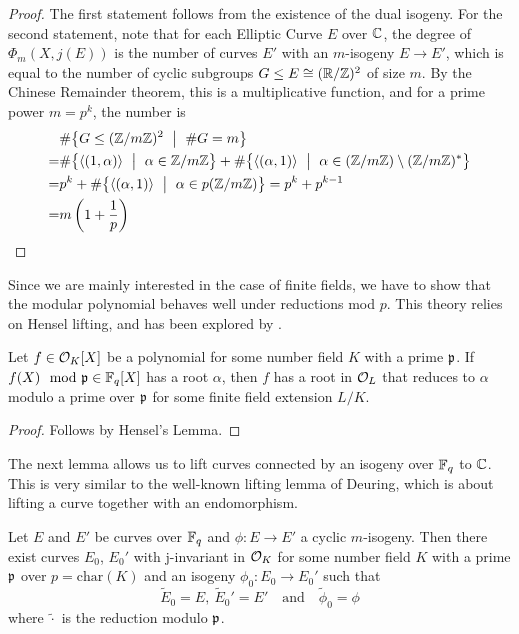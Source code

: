 \begin{proof}
    The first statement follows from the existence of the dual isogeny.
    For the second statement, note that for each Elliptic Curve $E$ over $\mathbb{C}$, the degree of $\Phi_m(X, j(E))$ is the number of curves $E'$ with an $m$-isogeny $E \to E'$, which is equal to the number of cyclic subgroups $G \leq E \cong (\mathbb{R}/\mathbb{Z})^2$ of size $m$.
    By the Chinese Remainder theorem, this is a multiplicative function, and for a prime power $m = p^k$, the number is
    \begin{align*}
       &\#\bigl\{ G \leq (\Z/m\Z)^2 \ \bigm| \ \#G = m \bigr\} \\
       =& \#\bigl\{ \langle (1, \alpha) \rangle \ \bigm| \ \alpha \in \Z/m\Z \bigr\} + \#\bigl\{ \langle (\alpha, 1) \rangle \ \bigm| \ \alpha \in (\Z/m\Z) \setminus (\Z/m\Z)^* \bigr\} \\
       =& p^k + \#\bigl\{ \langle (\alpha, 1) \rangle \ \bigm| \ \alpha \in p(\Z/m\Z) \bigr\} = p^k + p^{k - 1} \\
       =& m \left( 1 + \frac 1 p \right) \qedhere
    \end{align*}
\end{proof}
Since we are mainly interested in the case of finite fields, we have to show that the modular polynomial behaves well under reductions mod $p$.
This theory relies on Hensel lifting, and has been explored by \cite{deuring_endomorphism_rings}.
\begin{lemma}
    \label{prop:modified_hensel_lifting}
    Let $f \in \mathcal{O}_K[X]$ be a polynomial for some number field $K$ with a prime $\mathfrak{p}$.
    If $f(X) \mod {\mathfrak{p}} \in \mathbb{F}_q[X]$ has a root $\alpha$, then $f$ has a root in $\mathcal{O}_L$ that reduces to $\alpha$ modulo a prime over $\mathfrak{p}$ for some finite field extension $L/K$.
\end{lemma}
\begin{proof}
    Follows by Hensel's Lemma.
\end{proof}
The next lemma allows us to lift curves connected by an isogeny over $\mathbb{F}_q$ to $\mathbb{C}$.
This is very similar to the well-known lifting lemma of Deuring, which is about lifting a curve together with an endomorphism.
\begin{lemma}
    Let $E$ and $E'$ be curves over $\mathbb{F}_q$ and $\phi: E \to E'$ a cyclic $m$-isogeny.
    Then there exist curves $E_0$, $E_0'$ with j-invariant in $\mathcal{O}_K$ for some number field $K$ with a prime $\mathfrak{p}$ over $p = \mathrm{char}(K)$ and an isogeny $\phi_0: E_0 \to E_0'$ such that
    \begin{equation*}
        \tilde{E}_0 = E, \ \tilde{E}_0' = E' \quad \text{and} \quad \tilde{\phi}_0 = \phi
    \end{equation*}
    where $\tilde{\cdot}$ is the reduction modulo $\mathfrak{p}$.
\end{lemma}
